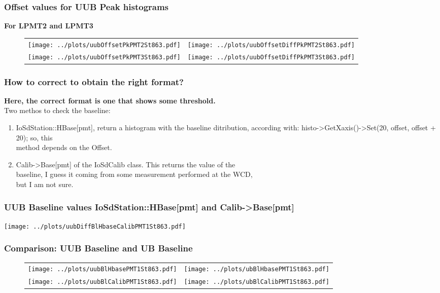 \documentclass[aspectratio=169]{beamer}
\begin{document}
			
\begin{frame}
	\frametitle{Offset values for UUB Peak histograms}
	{\bf For LPMT2 and LPMT3}
	\begin{figure}
		\centering
		\begin{tabularx}{\textwidth}{CC}
			\texttt{[image: ../plots/uubOffsetPkPMT2St863.pdf]}
			&
			\texttt{[image: ../plots/uubOffsetDiffPkPMT2St863.pdf]}
			\\
			\texttt{[image: ../plots/uubOffsetPkPMT3St863.pdf]}
			&
			\texttt{[image: ../plots/uubOffsetDiffPkPMT3St863.pdf]}
		\end{tabularx}
	\end{figure}
\end{frame}


\begin{frame}
	\frametitle{How to correct to obtain the right format?}
	{\bf Here, the correct format is one that shows some threshold.\\}
	\vspace{0.75cm}
	Two methos to check the baseline:
	\vspace{0.5cm}
	\begin{enumerate}
		\item IoSdStation::HBase[pmt], return a histogram with the baseline ditribution,
			according with: histo->GetXaxis()->Set(20, offset, offset + 20); so, this \\
			method depends on the Offset.
		\item Calib->Base[pmt] of the IoSdCalib class. This returns the value of the \\
			baseline, I guess it coming from some measurement performed at the WCD, \\
			but I am not sure.
	\end{enumerate}
\end{frame}






\begin{frame}
	\frametitle{UUB Baseline values IoSdStation::HBase[pmt] and Calib->Base[pmt]}
	\centering
	\texttt{[image: ../plots/uubDiffBlHbaseCalibPMT1St863.pdf]}
\end{frame}


\begin{frame}
	\frametitle{Comparison: UUB Baseline and UB Baseline}
	\begin{figure}
		\centering
		\begin{tabularx}{\textwidth}{CC}
			\texttt{[image: ../plots/uubBlHbasePMT1St863.pdf]}
			&
			\texttt{[image: ../plots/ubBlHbasePMT1St863.pdf]}
			\\
			\texttt{[image: ../plots/uubBlCalibPMT1St863.pdf]}
			&
			\texttt{[image: ../plots/ubBlCalibPMT1St863.pdf]}
		\end{tabularx}
	\end{figure}
\end{frame}
\end{document}
